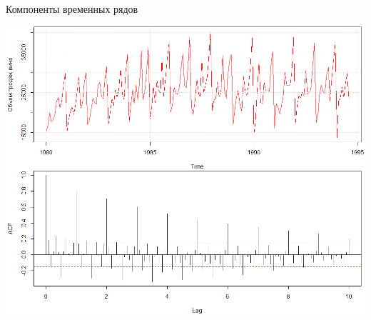 \documentclass[10pt,pdf,utf8,hyperref={unicode},aspectratio=169]{beamer}
\begin{document}
\begin{frame}{Компоненты временных рядов}
		\begin{center}
			\includegraphics[height=0.7\textheight]{wineacf.png}
		\end{center}				
\end{frame}
\end{document}
